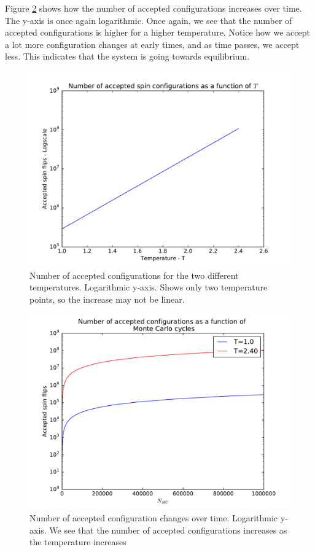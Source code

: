 \documentclass[12pt]{article}
\begin{document}
Figure \ref{fig:Accepted_configs_wrt_MC_cycles} shows how the number of accepted configurations increases over time. The y-axis is once again logarithmic. Once again, we see that the number of accepted configurations is higher for a higher temperature. Notice how we accept a lot more configuration changes at early times, and as time passes, we accept less. This indicates that the system is going towards equilibrium. 

\begin{figure}[H]
\centering
\includegraphics[width=\linewidth]{Plots/Accepted_configs_wrt_temp.pdf}
\caption{Number of accepted configurations for the two different temperatures. Logarithmic y-axis. Shows only two temperature points, so the increase may not be linear.}
\label{fig:Accepted_configs_wrt_temp}
\end{figure}

\begin{figure}[H]
\centering
\includegraphics[width=\linewidth]{Plots/Accepted_configurations_wrt_MC_cycles.pdf}
\caption{Number of accepted configuration changes over time. Logarithmic y-axis. We see that the number of accepted configurations increases as the temperature increases}
\label{fig:Accepted_configs_wrt_MC_cycles}
\end{figure}
\end{document}
